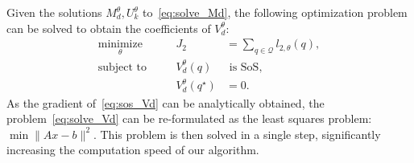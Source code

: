 Given the solutions $M_d^\theta, U_k^\theta$ to~\eqref{eq:solve_Md}, the
following optimization problem can be solved to obtain the coefficients of
$V_d^\theta$:
%
\begin{equation}
    \begin{aligned}
        \underset{\theta }{\textrm{minimize}} 
        &&\quad J_2 &= \sum_{q \in \mathcal{Q}} l_{2,\theta}(q), \\
        \textrm{subject to} 
        &&\quad V_d^\theta (q) &\textrm{ is SoS}, \\
        &&\quad V_d^\theta (q^\star) &= 0.
    \end{aligned}    
    \label{eq:solve_Vd}
\end{equation}
%
As the gradient of~\eqref{eq:sos_Vd} can be analytically obtained, the
problem~\eqref{eq:solve_Vd} can be re-formulated as the least squares problem:
$\min\|Ax - b\|^2$. This problem is then solved in a single step, significantly
increasing the computation speed of our algorithm.